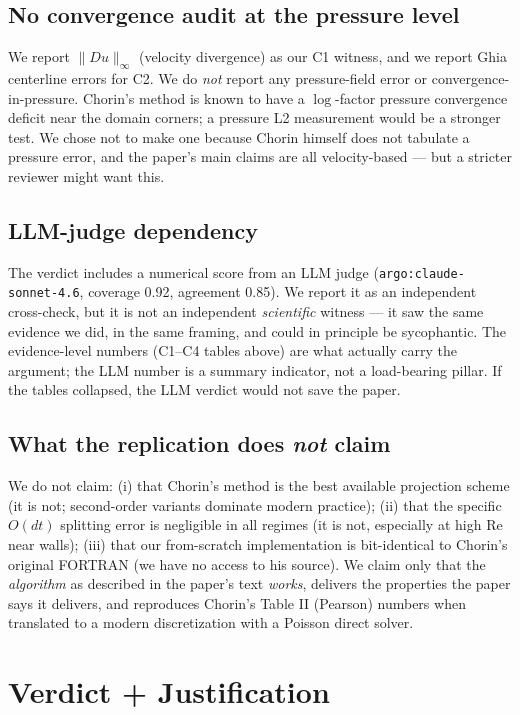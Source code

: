 \documentclass[11pt]{article}
\begin{document}
\subsection{No convergence audit at the pressure level}

We report $\|Du\|_\infty$ (velocity divergence) as our C1 witness, and we report Ghia centerline errors for C2. We do \emph{not} report any pressure-field error or convergence-in-pressure. Chorin's method is known to have a $\log$-factor pressure convergence deficit near the domain corners; a pressure L2 measurement would be a stronger test. We chose not to make one because Chorin himself does not tabulate a pressure error, and the paper's main claims are all velocity-based --- but a stricter reviewer might want this.

\subsection{LLM-judge dependency}

The verdict includes a numerical score from an LLM judge (\texttt{argo:claude-sonnet-4.6}, coverage 0.92, agreement 0.85). We report it as an independent cross-check, but it is not an independent \emph{scientific} witness --- it saw the same evidence we did, in the same framing, and could in principle be sycophantic. The evidence-level numbers (C1--C4 tables above) are what actually carry the argument; the LLM number is a summary indicator, not a load-bearing pillar. If the tables collapsed, the LLM verdict would not save the paper.

\subsection{What the replication does \emph{not} claim}

We do not claim: (i) that Chorin's method is the best available projection scheme (it is not; second-order variants dominate modern practice); (ii) that the specific $O(dt)$ splitting error is negligible in all regimes (it is not, especially at high Re near walls); (iii) that our from-scratch implementation is bit-identical to Chorin's original FORTRAN (we have no access to his source). We claim only that the \emph{algorithm} as described in the paper's text \emph{works}, delivers the properties the paper says it delivers, and reproduces Chorin's Table II (Pearson) numbers when translated to a modern discretization with a Poisson direct solver.

\section{Verdict + Justification}
\end{document}
